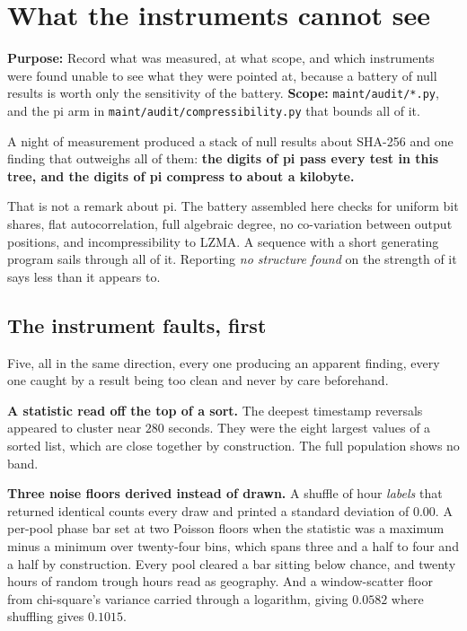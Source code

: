 \chapter{What the instruments cannot see}

\textbf{Purpose:} Record what was measured, at what scope, and which instruments were found unable to see what they were pointed at, because a battery of null results is worth only the sensitivity of the battery. \textbf{Scope:} \texttt{maint/\allowbreak{}audit/\allowbreak{}*.py}, and the pi arm in \texttt{maint/\allowbreak{}audit/\allowbreak{}compressibility.py} that bounds all of it.

A night of measurement produced a stack of null results about SHA-256 and one finding that outweighs all of them: \textbf{the digits of pi pass every test in this tree, and the digits of pi compress to about a kilobyte.}

That is not a remark about pi. The battery assembled here checks for uniform bit shares, flat autocorrelation, full algebraic degree, no co-variation between output positions, and incompressibility to LZMA. A sequence with a short generating program sails through all of it. Reporting \emph{no structure found} on the strength of it says less than it appears to.

\section{The instrument faults, first}

Five, all in the same direction, every one producing an apparent finding, every one caught by a result being too clean and never by care beforehand.

\textbf{A statistic read off the top of a sort.} The deepest timestamp reversals appeared to cluster near \(280\) seconds. They were the eight largest values of a sorted list, which are close together by construction. The full population shows no band.

\textbf{Three noise floors derived instead of drawn.} A shuffle of hour \emph{labels} that returned identical counts every draw and printed a standard deviation of \(0.00\). A per-pool phase bar set at two Poisson floors when the statistic was a maximum minus a minimum over twenty-four bins, which spans three and a half to four and a half by construction. Every pool cleared a bar sitting below chance, and twenty hours of random trough hours read as geography. And a window-scatter floor from chi-square's variance carried through a logarithm, giving \(0.0582\) where shuffling gives \(0.1015\).

